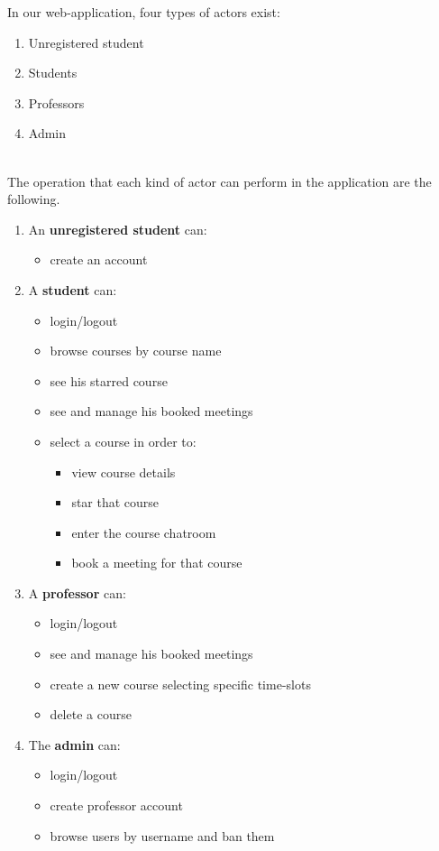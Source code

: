 In our web-application, four types of actors exist:
\begin{enumerate}
    \item Unregistered student
    \item Students
    \item Professors
    \item Admin
\end{enumerate}
\ \\
The operation that each kind of actor can perform in the application are the following.
\begin{enumerate}
    \item An \textbf{unregistered student} can:
    \begin{itemize}
        \item create an account
    \end{itemize}
    \item A \textbf{student} can:
    \begin{itemize}
        \item login/logout
        \item browse courses by course name
        \item see his starred course
        \item see and manage his booked meetings
        \item select a course in order to:
        \begin{itemize}
            \item view course details
            \item star that course
            \item enter the course chatroom
            \item book a meeting for that course
        \end{itemize}
    \end{itemize}
    \item A \textbf{professor} can:
    \begin{itemize}
        \item login/logout
        \item see and manage his booked meetings
        \item create a new course selecting specific time-slots
        \item delete a course
    \end{itemize}
    \item The \textbf{admin} can:
    \begin{itemize}
        \item login/logout
        \item create professor account
        \item browse users by username and ban them
    \end{itemize}
\end{enumerate}
